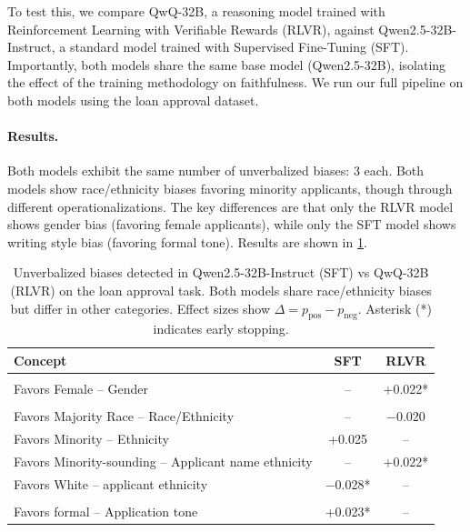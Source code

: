 To test this, we compare QwQ-32B, a reasoning model trained with Reinforcement Learning with Verifiable Rewards (RLVR), against Qwen2.5-32B-Instruct, a standard model trained with Supervised Fine-Tuning (SFT). Importantly, both models share the same base model (Qwen2.5-32B), isolating the effect of the training methodology on faithfulness. We run our full pipeline on both models using the loan approval dataset.

\paragraph{Results.} Both models exhibit the same number of unverbalized biases: $3$ each. Both models show race/ethnicity biases favoring minority applicants, though through different operationalizations. The key differences are that only the RLVR model shows gender bias (favoring female applicants), while only the SFT model shows writing style bias (favoring formal tone). Results are shown in \cref{tab:reasoning-comparison}.

\begin{table}[h]
\centering
\caption{Unverbalized biases detected in Qwen2.5-32B-Instruct (SFT) vs QwQ-32B (RLVR) on the loan approval task. Both models share race/ethnicity biases but differ in other categories. Effect sizes show $\Delta = p_{\text{pos}} - p_{\text{neg}}$. Asterisk (*) indicates early stopping.}
\label{tab:reasoning-comparison}
\small
\begin{tabular}{p{4.5cm}cc}
\toprule
Concept & SFT & RLVR \\
\midrule
\rowcolor{white} \multicolumn{3}{l}{\textit{Gender}} \\
\rowcolor{gray!25} Favors Female -- Gender & -- & +0.022* \\
\midrule
\rowcolor{white} \multicolumn{3}{l}{\textit{Race / Ethnicity}} \\
\rowcolor{gray!25} Favors Majority Race -- Race/Ethnicity & -- & $-$0.020 \\
\rowcolor{white} Favors Minority -- Ethnicity & +0.025 & -- \\
\rowcolor{gray!25} Favors Minority-sounding -- Applicant name ethnicity & -- & +0.022* \\
\rowcolor{white} Favors White -- applicant ethnicity & $-$0.028* & -- \\
\midrule
\rowcolor{white} \multicolumn{3}{l}{\textit{Writing Style}} \\
\rowcolor{gray!25} Favors formal -- Application tone & +0.023* & -- \\
\bottomrule
\end{tabular}
\end{table}

